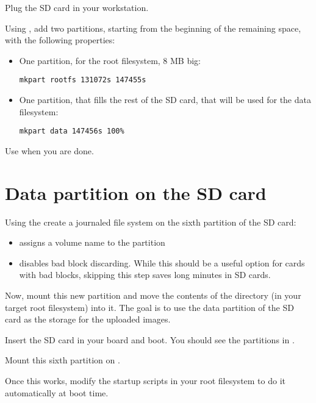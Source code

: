 Plug the SD card in your workstation.

Using , add two partitions, starting from the beginning
of the remaining space, with the following properties:

\begin{itemize}

\item One partition, for the root filesystem, 8 MB big:
\begin{verbatim}
mkpart rootfs 131072s 147455s
\end{verbatim}

\item One partition, that fills the rest of the SD card, that will be
  used for the data filesystem:
\begin{verbatim}
mkpart data 147456s 100%
\end{verbatim}

\end{itemize}

Use  when you are done.

\section{Data partition on the SD card}

Using the  create a journaled file system on the
sixth partition of the SD card:


\begin{itemize}
\item {} assigns a volume name to the partition
\item {} disables bad block discarding. While this
      should be a useful option for cards with bad blocks, skipping
      this step saves long minutes in SD cards.
\end{itemize}

Now, mount this new partition and move the contents of the
 directory (in your target root filesystem) into
it. The goal is to use the data partition of the SD card as the storage
for the uploaded images.

Insert the SD card in your board and boot. You should see the
partitions in .

Mount this sixth partition on .

Once this works, modify the startup scripts in your root filesystem
to do it automatically at boot time.

